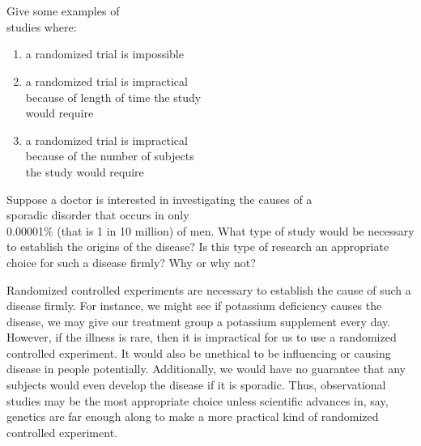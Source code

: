 \documentclass[11pt, chapterprefix=true]{scrbook}\usepackage[]{graphicx}\usepackage[]{color}
\begin{document}
\twocolumn
\section{}

\begin{exercises}
  \begin{exercise} %

Give some examples of \\ studies where:

\begin{enumerate}
\item a randomized trial is impossible
\item a randomized trial is impractical \\ because of length of time the study      \\ would require
\item a randomized trial is impractical \\ because of the number of subjects \\ the study would require
\end{enumerate}


	\end{exercise}

  \begin{exercise} %

Suppose a doctor is interested in investigating the causes of a \\ sporadic disorder that occurs in only \\ 0.00001\% (that is 1 in 10 million) of men.  What type of study would be necessary to establish the origins of the disease?  Is this type of research an appropriate choice for such a disease firmly?  Why or why not?

	\end{exercise}
	\begin{solution}  %
	
Randomized controlled experiments are necessary to establish the cause of such a disease firmly. For instance, we might see if potassium deficiency causes the disease, we may give our treatment group a potassium supplement every day. However, if the illness is rare, then it is impractical for us to use a randomized controlled experiment.  It would also be unethical to be influencing or causing disease in people potentially.  Additionally, we would have no guarantee that any subjects would even develop the disease if it is sporadic. Thus, observational studies may be the most appropriate choice unless scientific advances in, say, genetics are far enough along to make a more practical kind of randomized controlled experiment.
	

\end{solution}
\end{exercises}
\end{document}
